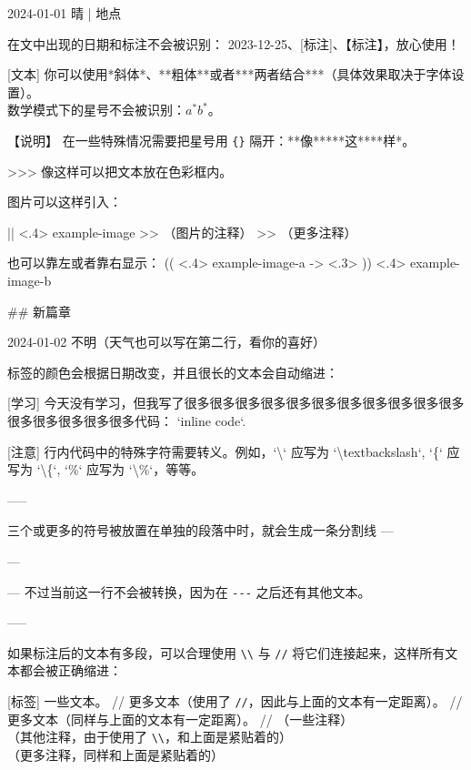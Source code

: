 \documentclass[11pt, paperstyle=light yellow, color entry,
  title in boldface, title in sffamily, use style = classical]{jwjournal}
\begin{document}
2024-01-01 晴 | 地点

  在文中出现的日期和标注不会被识别： 2023-12-25、[标注]、【标注】，放心使用！

  [文本]
    你可以使用*斜体*、**粗体**或者***两者结合***（具体效果取决于字体设置）。
    \\
    数学模式下的星号不会被识别：$a^* b^*$。

  【说明】 %
    在一些特殊情况需要把星号用 \texttt{\{\}} 隔开：**像**{}***这***{}*样*。

  >>> 像这样可以把文本放在色彩框内。

  图片可以这样引入：

  || <.4> {example-image} %
  >> （图片的注释）
  >> （更多注释）

  也可以靠左或者靠右显示：
  (( <.4> {example-image-a} %
  -> <.3> %
  )) <.4> {example-image-b} %


## {新篇章}

2024-01-02
不明（天气也可以写在第二行，看你的喜好）

  标签的颜色会根据日期改变，并且很长的文本会自动缩进：

  [学习] 今天没有学习，但我写了很多很多很多很多很多很多很多很多很多很多很多很多很多很多很多很多代码： `inline code`.

  [注意] 行内代码中的特殊字符需要转义。例如，`\textbackslash` 应写为 `\textbackslash textbackslash`, `\{` 应写为 `\textbackslash\{`, `\%` 应写为 `\textbackslash\%`，等等。

  -----

  三个或更多的\textquote{\texttt{-}}符号被放置在单独的段落中时，就会生成一条分割线 ---

  ---

  --- 不过当前这一行不会被转换，因为在 \texttt{-}\texttt{-}\texttt{-} 之后还有其他文本。

  -----

  如果标注后的文本有多段，可以合理使用 \texttt{\textbackslash\textbackslash} 与 \texttt{\slash\slash} 将它们连接起来，这样所有文本都会被正确缩进：

  [标签] 一些文本。
    //
    更多文本（使用了 \texttt{\slash\slash}，因此与上面的文本有一定距离）。
    //
    更多文本（同样与上面的文本有一定距离）。
    //
    （一些注释）
    \\
    （其他注释，由于使用了 \texttt{\textbackslash\textbackslash}，和上面是紧贴着的）
    \\
    （更多注释，同样和上面是紧贴着的）
\end{document}

